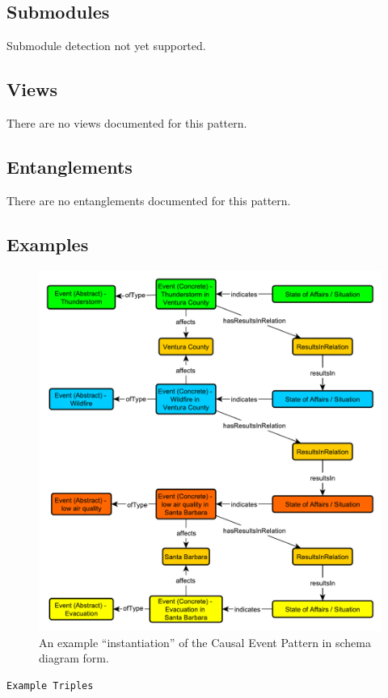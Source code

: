\subsection{Submodules}
\label{ssec:submodules}
Submodule detection not yet supported.

\subsection{Views}
\label{ssec:views}
There are no views documented for this pattern.


\subsection{Entanglements}
\label{ssec:entanglements}
There are no entanglements documented for this pattern.

\subsection{Examples}
\label{ssec:examples}
\begin{figure}[h!]
  \begin{center}
    \includegraphics[width=\textwidth]{resources/causal-event-example.pdf}
  \end{center}
  \caption{An example ``instantiation'' of the Causal Event Pattern in schema diagram form.}
  \label{fig:ex-diagram}
\end{figure}
\begin{verbatim}
Example Triples
\end{verbatim}

